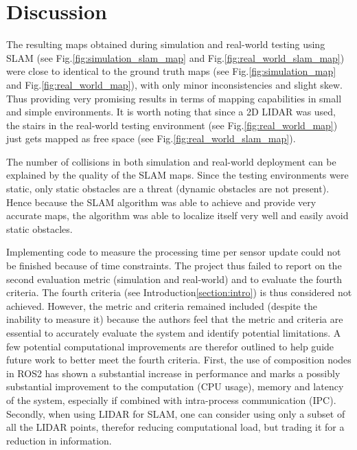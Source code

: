 \section{Discussion}


The resulting maps obtained during simulation and real-world testing using SLAM (see Fig.\:\ref{fig:simulation_slam_map} and Fig.\:\ref{fig:real_world_slam_map}) were close to identical to the ground truth maps (see Fig.\:\ref{fig:simulation_map} and Fig.\:\ref{fig:real_world_map}), with only minor inconsistencies and slight skew. Thus providing very promising results in terms of mapping capabilities in small and simple environments.
It is worth noting that since a 2D LIDAR was used, the stairs in the real-world testing environment (see Fig.\:\ref{fig:real_world_map}) just gets mapped as free space (see Fig.\:\ref{fig:real_world_slam_map}).


The number of collisions in both simulation and real-world deployment can be explained by the quality of the SLAM maps. Since the testing environments were static, only static obstacles are a threat (dynamic obstacles are not present). Hence because the SLAM algorithm was able to achieve and provide very accurate maps, the algorithm was able to localize itself very well and easily avoid static obstacles.

Implementing code to measure the processing time per sensor update could not be finished because of time constraints. The project thus failed to report on the second evaluation metric (simulation and real-world) and to evaluate the fourth criteria. The fourth criteria (see Introduction\:\ref{section:intro}) is thus considered not achieved.
However, the metric and criteria remained included (despite the inability to measure it) because the authors feel that the metric and criteria are essential to accurately evaluate the system and identify potential limitations. A few potential computational improvements are therefor outlined to help guide future work to better meet the fourth criteria.
First, the use of composition nodes in ROS2 has shown a substantial increase in performance and marks a possibly substantial improvement to the computation (CPU usage), memory and latency of the system, especially if combined with intra-process communication (IPC)\:\cite{macenski_impact_2023}.
Secondly, when using LIDAR for SLAM, one can consider using only a subset of all the LIDAR points, therefor reducing computational load, but trading it for a reduction in information\:\cite{filip_lidar_2023}.

